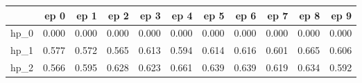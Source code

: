 \begin{tabular}{lrrrrrrrrrr}
\toprule
{} &   ep 0 &   ep 1 &   ep 2 &   ep 3 &   ep 4 &   ep 5 &   ep 6 &   ep 7 &   ep 8 &   ep 9 \\
\midrule
hp\_0 &  0.000 &  0.000 &  0.000 &  0.000 &  0.000 &  0.000 &  0.000 &  0.000 &  0.000 &  0.000 \\
hp\_1 &  0.577 &  0.572 &  0.565 &  0.613 &  0.594 &  0.614 &  0.616 &  0.601 &  0.665 &  0.606 \\
hp\_2 &  0.566 &  0.595 &  0.628 &  0.623 &  0.661 &  0.639 &  0.639 &  0.619 &  0.634 &  0.592 \\
\bottomrule
\end{tabular}
